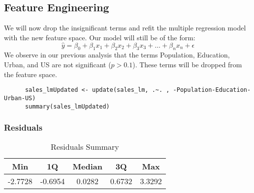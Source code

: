 \documentclass{article}
\theoremstyle{mytheoremstyle}
\theoremstyle{mytheoremstyle}
\theoremstyle{myproblemstyle}
\begin{document}
      \subsection{Feature Engineering}
      
      We will now drop the insignificant terms and refit the multiple regression model with the new feature space. Our model will still be of the form:
      \[
        \hat{y} = \beta_0 + \beta_1 x_1 + \beta_2 x_2 + \beta_3 x_3 + \dots + \beta_n x_n + \epsilon
      \]
      We observe in our previous analysis that the terms Population, Education, Urban, and US are not significant (\(p > 0.1\)). These terms will be dropped from the feature space.

      \begin{lstlisting}
      sales_lmUpdated <- update(sales_lm, .~. , -Population-Education-Urban-US)
      summary(sales_lmUpdated)
      \end{lstlisting}
      \subsubsection{Residuals}
      \begin{table}[H]
          \centering
          \begin{tabular}{ccccc}
              \toprule
              Min & 1Q & Median & 3Q & Max \\
              \midrule
              -2.7728 & -0.6954 & 0.0282 & 0.6732 & 3.3292 \\
              \bottomrule
          \end{tabular}
          \caption{Residuals Summary}
          \label{tab:residuals_updated}
      \end{table}
\end{document}
